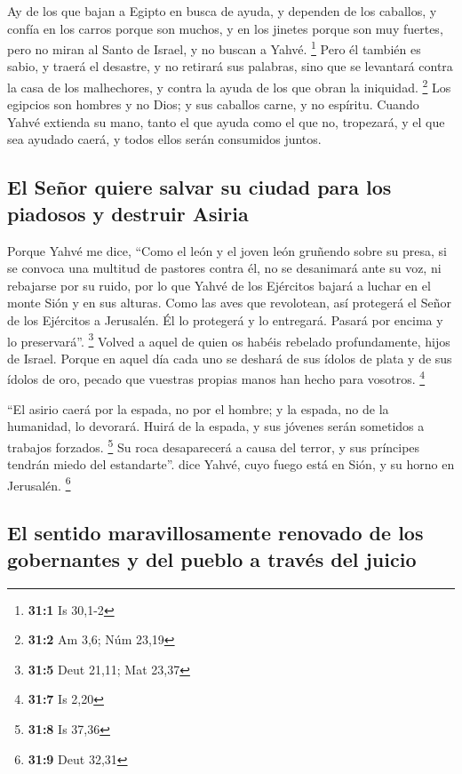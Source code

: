  Ay de los que bajan a Egipto en busca de ayuda, y
dependen de los caballos, y confía en los carros porque son muchos, y en
los jinetes porque son muy fuertes, pero no miran al Santo de Israel, y
no buscan a Yahvé. \footnote{\textbf{31:1} Is 30,1-2} 
Pero él también es sabio, y traerá el desastre, y no retirará sus
palabras, sino que se levantará contra la casa de los malhechores, y
contra la ayuda de los que obran la iniquidad. \footnote{\textbf{31:2}
  Am 3,6; Núm 23,19}  Los egipcios son hombres y no Dios;
y sus caballos carne, y no espíritu. Cuando Yahvé extienda su mano,
tanto el que ayuda como el que no, tropezará, y el que sea ayudado
caerá, y todos ellos serán consumidos juntos.

\hypertarget{el-seuxf1or-quiere-salvar-su-ciudad-para-los-piadosos-y-destruir-asiria}{%
\subsection{El Señor quiere salvar su ciudad para los piadosos y
destruir
Asiria}\label{el-seuxf1or-quiere-salvar-su-ciudad-para-los-piadosos-y-destruir-asiria}}

 Porque Yahvé me dice, ``Como el león y el joven león
gruñendo sobre su presa, si se convoca una multitud de pastores contra
él, no se desanimará ante su voz, ni rebajarse por su ruido, por lo que
Yahvé de los Ejércitos bajará a luchar en el monte Sión y en sus
alturas.  Como las aves que revolotean, así protegerá el
Señor de los Ejércitos a Jerusalén. Él lo protegerá y lo entregará.
Pasará por encima y lo preservará''. \footnote{\textbf{31:5} Deut 21,11;
  Mat 23,37}  Volved a aquel de quien os habéis rebelado
profundamente, hijos de Israel.  Porque en aquel día cada
uno se deshará de sus ídolos de plata y de sus ídolos de oro, pecado que
vuestras propias manos han hecho para vosotros. \footnote{\textbf{31:7}
  Is 2,20}

 ``El asirio caerá por la espada, no por el hombre; y la
espada, no de la humanidad, lo devorará. Huirá de la espada, y sus
jóvenes serán sometidos a trabajos forzados. \footnote{\textbf{31:8} Is
  37,36}  Su roca desaparecerá a causa del terror, y sus
príncipes tendrán miedo del estandarte''. dice Yahvé, cuyo fuego está en
Sión, y su horno en Jerusalén. \footnote{\textbf{31:9} Deut 32,31}

\hypertarget{el-sentido-maravillosamente-renovado-de-los-gobernantes-y-del-pueblo-a-travuxe9s-del-juicio}{%
\subsection{El sentido maravillosamente renovado de los gobernantes y
del pueblo a través del
juicio}\label{el-sentido-maravillosamente-renovado-de-los-gobernantes-y-del-pueblo-a-travuxe9s-del-juicio}}

